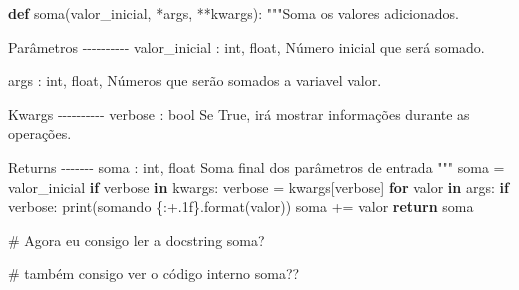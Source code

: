 \documentclass[
  letterpaper,
  DIV=11,
  numbers=noendperiod]{scrreprt}
\newenvironment{Shaded}{\begin{snugshade}}{\end{snugshade}}
\newcommand{\BuiltInTok}[1]{\textcolor[rgb]{0.00,0.23,0.31}{#1}}
\newcommand{\CommentTok}[1]{\textcolor[rgb]{0.37,0.37,0.37}{#1}}
\newcommand{\ControlFlowTok}[1]{\textcolor[rgb]{0.00,0.23,0.31}{\textbf{#1}}}
\newcommand{\KeywordTok}[1]{\textcolor[rgb]{0.00,0.23,0.31}{\textbf{#1}}}
\newcommand{\NormalTok}[1]{\textcolor[rgb]{0.00,0.23,0.31}{#1}}
\newcommand{\OperatorTok}[1]{\textcolor[rgb]{0.37,0.37,0.37}{#1}}
\newcommand{\SpecialCharTok}[1]{\textcolor[rgb]{0.37,0.37,0.37}{#1}}
\newcommand{\StringTok}[1]{\textcolor[rgb]{0.13,0.47,0.30}{#1}}
\begin{document}
\begin{Shaded}
\begin{Highlighting}[]
\KeywordTok{def}\NormalTok{ soma(valor\_inicial, }\OperatorTok{*}\NormalTok{args, }\OperatorTok{**}\NormalTok{kwargs):}
    \CommentTok{"""Soma os valores adicionados.}

\CommentTok{    Parâmetros}
\CommentTok{    {-}{-}{-}{-}{-}{-}{-}{-}{-}{-}}
\CommentTok{    valor\_inicial : \textasciigrave{}int\textasciigrave{}, \textasciigrave{}float\textasciigrave{},}
\CommentTok{        Número inicial que será somado.}

\CommentTok{    args : \textasciigrave{}int\textasciigrave{}, \textasciigrave{}float\textasciigrave{},}
\CommentTok{        Números que serão somados a variavel valor.}

\CommentTok{    Kwargs}
\CommentTok{    {-}{-}{-}{-}{-}{-}{-}{-}{-}{-}}
\CommentTok{    verbose : \textasciigrave{}bool\textasciigrave{}}
\CommentTok{        Se \textasciigrave{}True\textasciigrave{}, irá mostrar informações durante as operações.}

\CommentTok{    Returns}
\CommentTok{    {-}{-}{-}{-}{-}{-}{-}}
\CommentTok{    soma : \textasciigrave{}int\textasciigrave{}, \textasciigrave{}float\textasciigrave{}}
\CommentTok{        Soma final dos parâmetros de entrada}
\CommentTok{    """}
\NormalTok{    soma }\OperatorTok{=}\NormalTok{ valor\_inicial}
    \ControlFlowTok{if} \StringTok{\textquotesingle{}verbose\textquotesingle{}} \KeywordTok{in}\NormalTok{ kwargs:}
\NormalTok{        verbose }\OperatorTok{=}\NormalTok{ kwargs[}\StringTok{\textquotesingle{}verbose\textquotesingle{}}\NormalTok{]}
    \ControlFlowTok{for}\NormalTok{ valor }\KeywordTok{in}\NormalTok{ args:}
        \ControlFlowTok{if}\NormalTok{ verbose:}
            \BuiltInTok{print}\NormalTok{(}\StringTok{\textquotesingle{}somando }\SpecialCharTok{\{:+.1f\}}\StringTok{\textquotesingle{}}\NormalTok{.}\BuiltInTok{format}\NormalTok{(valor))}
\NormalTok{        soma }\OperatorTok{+=}\NormalTok{ valor}
    \ControlFlowTok{return}\NormalTok{ soma}
\end{Highlighting}
\end{Shaded}

\begin{Shaded}
\begin{Highlighting}[]
\CommentTok{\# Agora eu consigo ler a docstring}
\NormalTok{soma?}
\end{Highlighting}
\end{Shaded}

\begin{Shaded}
\begin{Highlighting}[]
\CommentTok{\# também consigo ver o código interno}
\NormalTok{soma??}
\end{Highlighting}
\end{Shaded}
\end{document}
